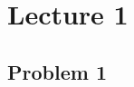 \documentclass[12pt]{report}
\begin{document}
\chapter*{Lecture 1}
\section*{Problem 1}
\end{document}
